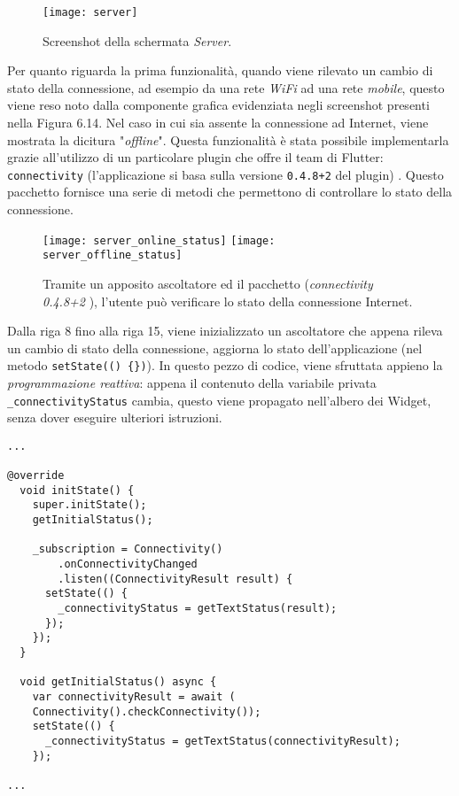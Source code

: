 \begin{figure}
	\begin{center}
		\texttt{[image: server]}
		\caption[Screenshot - Server]{Screenshot della schermata \textit{Server}.}
		\label{figura:server}
	\end{center}
\end{figure}

Per quanto riguarda la prima funzionalità, quando viene rilevato un cambio di stato della connessione, ad esempio da una rete \textit{WiFi} ad una rete \textit{mobile}, questo viene reso noto dalla componente grafica evidenziata negli screenshot presenti nella Figura 6.14. Nel caso in cui sia assente la connessione ad Internet, viene mostrata la dicitura "\textit{offline}". Questa funzionalità è stata possibile implementarla grazie all'utilizzo di un particolare plugin che offre il team di Flutter: \verb|connectivity| (l'applicazione si basa sulla versione \verb|0.4.8+2| del plugin) \cite{connectivity_plugin}. Questo pacchetto fornisce una serie di metodi che permettono di controllare lo stato della connessione.

\begin{figure}[htp]
	\centering
	\texttt{[image: server\_online\_status]}
	\texttt{[image: server\_offline\_status]}
	\caption[Screenshot - Controllo dello stato della connessione nella schermata Server]{Tramite un apposito ascoltatore ed il pacchetto (\textit{connectivity 0.4.8+2} \cite{connectivity_plugin}), l'utente può verificare lo stato della connessione Internet.}\label{xyz}
\end{figure}

Dalla riga 8 fino alla riga 15, viene inizializzato un ascoltatore che appena rileva un cambio di stato della connessione, aggiorna lo stato dell'applicazione (nel metodo \verb|setState(() {})|). In questo pezzo di codice, viene sfruttata appieno la \textit{programmazione reattiva}: appena il contenuto della variabile privata \verb|_connectivityStatus| cambia, questo viene propagato nell'albero dei Widget, senza dover eseguire ulteriori istruzioni. 

\newpage

\begin{lstlisting}
...

@override
  void initState() {
    super.initState();
    getInitialStatus();

    _subscription = Connectivity()
        .onConnectivityChanged
        .listen((ConnectivityResult result) {
      setState(() {
        _connectivityStatus = getTextStatus(result);
      });
    });
  }

  void getInitialStatus() async {
    var connectivityResult = await (
    Connectivity().checkConnectivity());
    setState(() {
      _connectivityStatus = getTextStatus(connectivityResult);
    });
    
...
\end{lstlisting}

